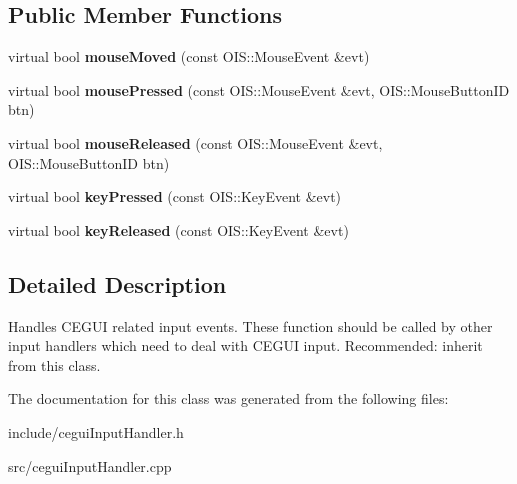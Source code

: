 \subsection*{\-Public \-Member \-Functions}
\begin{DoxyCompactItemize}
\item 
\hypertarget{classCEGUIInputHandler_a21433670dd755af803dc6c1b25f55073}{
virtual bool {\bfseries mouse\-Moved} (const \-O\-I\-S\-::\-Mouse\-Event \&evt)}
\label{db/d68/classCEGUIInputHandler_a21433670dd755af803dc6c1b25f55073}

\item 
\hypertarget{classCEGUIInputHandler_afa223acd83234d0c828c92112dde0ca2}{
virtual bool {\bfseries mouse\-Pressed} (const \-O\-I\-S\-::\-Mouse\-Event \&evt, \-O\-I\-S\-::\-Mouse\-Button\-I\-D btn)}
\label{db/d68/classCEGUIInputHandler_afa223acd83234d0c828c92112dde0ca2}

\item 
\hypertarget{classCEGUIInputHandler_a93ec53e35710fca8b10985ecce70e54a}{
virtual bool {\bfseries mouse\-Released} (const \-O\-I\-S\-::\-Mouse\-Event \&evt, \-O\-I\-S\-::\-Mouse\-Button\-I\-D btn)}
\label{db/d68/classCEGUIInputHandler_a93ec53e35710fca8b10985ecce70e54a}

\item 
\hypertarget{classCEGUIInputHandler_ae433573bb9957e378d8ac1ee43ec7d0f}{
virtual bool {\bfseries key\-Pressed} (const \-O\-I\-S\-::\-Key\-Event \&evt)}
\label{db/d68/classCEGUIInputHandler_ae433573bb9957e378d8ac1ee43ec7d0f}

\item 
\hypertarget{classCEGUIInputHandler_a439856153d5f774dc51450602788a45f}{
virtual bool {\bfseries key\-Released} (const \-O\-I\-S\-::\-Key\-Event \&evt)}
\label{db/d68/classCEGUIInputHandler_a439856153d5f774dc51450602788a45f}

\end{DoxyCompactItemize}


\subsection{\-Detailed \-Description}
\-Handles \-C\-E\-G\-U\-I related input events. \-These function should be called by other input handlers which need to deal with \-C\-E\-G\-U\-I input. \-Recommended\-: inherit from this class. 

\-The documentation for this class was generated from the following files\-:\begin{DoxyCompactItemize}
\item 
include/cegui\-Input\-Handler.\-h\item 
src/cegui\-Input\-Handler.\-cpp\end{DoxyCompactItemize}
